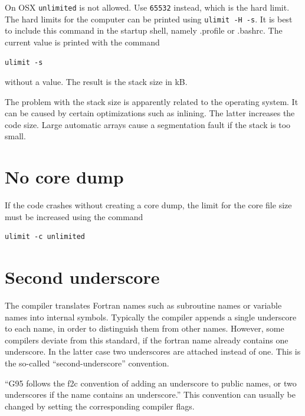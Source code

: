 \documentclass[a4paper,10pt]{report}
\begin{document}
On OSX \verb|unlimited| is not allowed. Use \verb|65532| instead,
which is the hard limit. The hard limits for the computer can be
printed using \verb|ulimit -H -s|.  It is best to include this command
in the startup shell, namely .profile or .bashrc. The current value is
printed with the command
\begin{verbatim}
ulimit -s 
\end{verbatim}
without a value. The result is the stack size in kB.


The problem with the stack size is apparently related to the operating
system. It can be caused by certain optimizations such as
inlining. The latter increases the code size. Large automatic arrays
cause a segmentation fault if the stack is too small.


\section{No core dump}
If the code crashes without creating a core dump,
the limit for the core file size must be increased using the command
\begin{verbatim}
ulimit -c unlimited
\end{verbatim}

\section{Second underscore}
The compiler translates Fortran names such as subroutine names or
variable names into internal symbols. Typically the compiler appends a
single underscore to each name, in order to distinguish them from
other names. However, some compilers deviate from this standard, if
the fortran name already contains one underscore. In the latter case
two underscores are attached instead of one. This is the so-called
``second-underscore'' convention.
\begin{center}
``G95 follows the f2c convention of adding an underscore to public
names, or two underscores if the name contains an underscore.'' This
convention can usually be changed by setting the corresponding
compiler flags.
\end{center}
\end{document}
